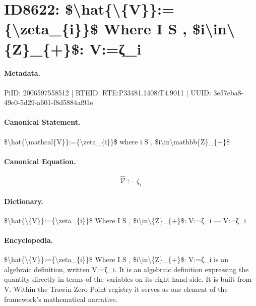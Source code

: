 \section*{ID8622: \$\textbackslash{}hat\{\textbackslash{}\{V\}\}:=\{\textbackslash{}zeta\_\{i\}\}\$ Where I S , \$i\textbackslash{}in\textbackslash{}\{Z\}\_\{+\}\$: V:=ζ\_i}
\paragraph{Metadata.}
PiID: 2006597558512 | RTEID: RTE:P33481.1408:T4.9011 | UUID: 3e57eba8-49e0-5d29-a601-f8d5884af91e

\paragraph{Canonical Statement.}
\$\textbackslash{}hat\{\textbackslash{}mathcal\{V\}\}:=\{\textbackslash{}zeta\_\{i\}\}\$ where i S , \$i\textbackslash{}in\textbackslash{}mathbb\{Z\}\_\{+\}\$

\paragraph{Canonical Equation.}
\[
\hat{\mathcal{V}}:={\zeta_{i}}
\]

\paragraph{Dictionary.}
\$\textbackslash{}hat\{\textbackslash{}\{V\}\}:=\{\textbackslash{}zeta\_\{i\}\}\$ Where I S , \$i\textbackslash{}in\textbackslash{}\{Z\}\_\{+\}\$: V:=ζ\_i — V:=ζ\_i

\paragraph{Encyclopedia.}
\$\textbackslash{}hat\{\textbackslash{}\{V\}\}:=\{\textbackslash{}zeta\_\{i\}\}\$ Where I S , \$i\textbackslash{}in\textbackslash{}\{Z\}\_\{+\}\$: V:=ζ\_i is an algebraic definition, written V:=ζ\_i. It is an algebraic definition expressing the quantity directly in terms of the variables on its right-hand side. It is built from V. Within the Trawin Zero Point registry it serves as one element of the framework's mathematical narrative.
